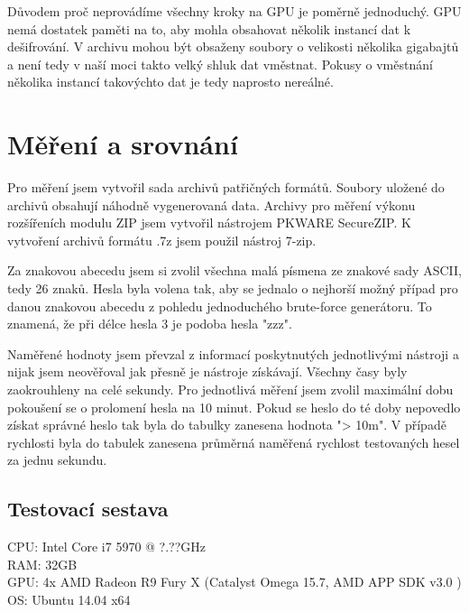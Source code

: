 Důvodem proč neprovádíme všechny kroky na GPU je poměrně jednoduchý. GPU nemá dostatek paměti na
to, aby mohla obsahovat několik instancí dat k dešifrování. V archivu mohou být obsaženy soubory o
velikosti několika gigabajtů a není tedy v naší moci takto velký shluk dat vměstnat. Pokusy o
vměstnání několika instancí takovýchto dat je tedy naprosto nereálné. 

\chapter{Měření a srovnání}
\label{ch:mereni_a_srovnani}
Pro měření jsem vytvořil sada archivů patřičných formátů. Soubory uložené do archivů obsahují
náhodně vygenerovaná data. Archivy pro měření výkonu rozšířeních modulu ZIP jsem vytvořil nástrojem
PKWARE SecureZIP. K vytvoření archivů formátu .7z jsem použil nástroj 7-zip.

Za znakovou abecedu jsem si zvolil všechna malá písmena ze znakové sady ASCII, tedy 26 znaků. Hesla
byla volena tak, aby se jednalo o nejhorší možný případ pro danou znakovou abecedu z pohledu
jednoduchého brute-force generátoru. To znamená, že při délce hesla 3 je podoba hesla "zzz".

Naměřené hodnoty jsem převzal z informací poskytnutých jednotlivými nástroji a nijak jsem
neověřoval jak přesně je nástroje získávají. Všechny časy byly zaokrouhleny na celé sekundy. Pro
jednotlivá měření jsem zvolil maximální dobu pokoušení se o prolomení hesla na 10 minut. Pokud se
heslo do té doby nepovedlo získat správné heslo tak byla do tabulky zanesena hodnota "> 10m".
V případě rychlosti byla do tabulek zanesena průměrná naměřená rychlost testovaných hesel za jednu
sekundu.

\section{Testovací sestava}
CPU: Intel Core i7 5970 @ ?.??GHz\\
RAM: 32GB\\
GPU: 4x AMD Radeon R9 Fury X (Catalyst Omega 15.7, AMD APP SDK v3.0 )\\
OS: Ubuntu 14.04 x64

